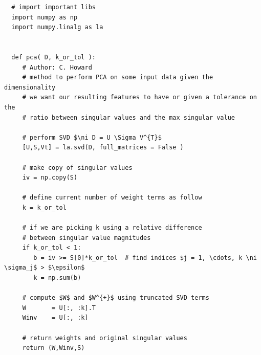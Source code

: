 \documentclass{article}[12pt]
\begin{document}
   \begin{verbatim}
  # import important libs
  import numpy as np
  import numpy.linalg as la


  def pca( D, k_or_tol ):
     # Author: C. Howard
     # method to perform PCA on some input data given the dimensionality
     # we want our resulting features to have or given a tolerance on the
     # ratio between singular values and the max singular value

     # perform SVD $\ni D = U \Sigma V^{T}$
     [U,S,Vt] = la.svd(D, full_matrices = False )

     # make copy of singular values
     iv = np.copy(S)

     # define current number of weight terms as follow
     k = k_or_tol

     # if we are picking k using a relative difference
     # between singular value magnitudes
     if k_or_tol < 1:
        b = iv >= S[0]*k_or_tol  # find indices $j = 1, \cdots, k \ni \sigma_j$ > $\epsilon$
        k = np.sum(b)

     # compute $W$ and $W^{+}$ using truncated SVD terms
     W       = U[:, :k].T
     Winv    = U[:, :k]

     # return weights and original singular values
     return (W,Winv,S)
\end{verbatim}
\end{document}
